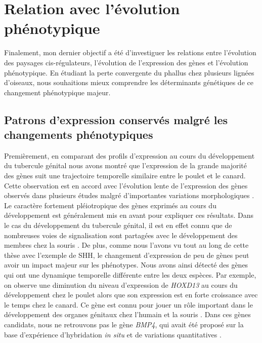 \section{Relation avec l’évolution phénotypique}

Finalement, mon dernier objectif a été d'investiguer les relations entre l'évolution des paysages \gls{cis}-régulateurs, l'évolution de l'expression des gènes et l'évolution phénotypique. En étudiant la perte convergente du phallus chez plusieurs lignées d’oiseaux, nous souhaitions mieux comprendre les déterminants génétiques de ce changement phénotypique majeur.

\subsection{Patrons d’expression conservés malgré les changements phénotypiques}

Premièrement, en comparant des profils d’expression au cours du développement du tubercule génital nous avons montré que l’expression de la grande majorité des gènes suit une trajectoire temporelle similaire entre le poulet et le canard. Cette observation est en accord avec l’évolution lente de l’expression des gènes observés dans plusieurs études malgré d’importantes variations morphologiques \citep{brawand_evolution_2011, cardoso-moreira_gene_2019}. Le caractère fortement pléiotropique des gènes exprimés au cours du développement est généralement mis en avant pour expliquer ces résultats. Dans le cas du développement du tubercule génital, il est en effet connu que de nombreuses voies de signalisation sont partagées avec le développement des membres chez la souris \citep{lonfat_convergent_2014,infante_shared_2015}. De plus, comme nous l’avons vu tout au long de cette thèse avec l’exemple de \acrshort{SHH}, le changement d’expression de peu de gènes peut avoir un impact majeur sur les phénotypes. Nous avons ainsi détecté des gènes qui ont une dynamique temporelle différente entre les deux espèces. Par exemple, on observe une diminution du niveau d'expression de \textit{HOXD13} au cours du développement chez le poulet alors que son expression est en forte croissance avec le temps chez le canard.  Ce gène est connu pour jouer un rôle important dans le développement des organes génitaux chez l'humain et la souris \citep{dolle_hox-4_1991, klonisch_molecular_2004}. Dans ces gènes candidats, nous ne retrouvons pas le gène \textit{BMP4}, qui avait été proposé sur la base d'expérience d’hybridation \textit{in situ} et de variations quantitatives \citep{herrera_developmental_2013}. \\


